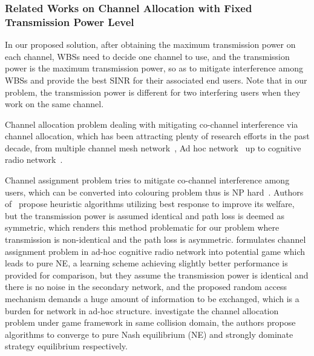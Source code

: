 \subsubsection*{Related Works on Channel Allocation with Fixed Transmission Power Level}
\label{CA}
In our proposed solution, after obtaining the maximum transmission power on each channel, WBSs need to decide one channel to use, and the transmission power is the maximum transmission power, so as to mitigate interference among WBSs and provide the best SINR for their associated end users.
Note that in our problem, the transmission power is different for two interfering users when they work on the same channel.

Channel allocation problem dealing with mitigating co-channel interference via channel allocation, which has been attracting plenty of research efforts in the past decade, from multiple channel mesh network~\cite{Hyacinth}, Ad hoc network~\cite{Ko_DistributedCA} up to cognitive radio network~\cite{SA_CA_TVWS_2012crowncom,qlearning_huang}. 

Channel assignment problem tries to mitigate co-channel interference among users, which can be converted into colouring problem thus is NP hard~\cite{Hyacinth}. 
Authors of~\cite{Ko_DistributedCA} propose heuristic algorithms utilizing best response to improve its welfare, but the transmission power is assumed identical and path loss is deemed as symmetric, which renders this method problematic for our problem where transmission is non-identical and the path loss is asymmetric.
\cite{CApotentialLearning_05dyspan} formulates channel assignment problem in ad-hoc cognitive radio network into potential game which leads to pure NE, a learning scheme achieving slightly better performance is provided for comparison, but they assume the transmission power is identical and there is no noise in the secondary network, and the proposed random access mechanism demands a huge amount of information to be exchanged, which is a burden for network in ad-hoc structure.
\cite{CA_Felegyhazi_07infocom, Wu_GOP_CA_08infocom} investigate the channel allocation problem under game framework in same collision domain, the authors propose algorithms to converge to pure Nash equilibrium (NE) and strongly dominate strategy equilibrium respectively. 

